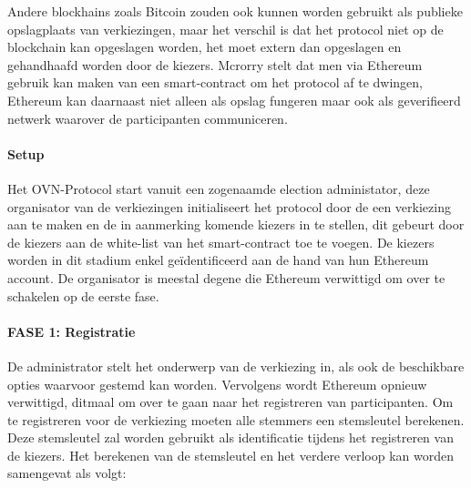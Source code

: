 			Andere blockhains zoals Bitcoin zouden ook kunnen worden gebruikt als publieke opslagplaats van verkiezingen, maar het verschil is dat het protocol niet op de blockchain kan opgeslagen worden, het moet extern dan opgeslagen en gehandhaafd worden door de kiezers. Mcrorry stelt dat men via Ethereum gebruik kan maken van een smart-contract om  het protocol af te dwingen, Ethereum kan daarnaast niet alleen als opslag fungeren maar ook als geverifieerd netwerk waarover de participanten communiceren.
			\paragraph*{Setup }
			Het OVN-Protocol start vanuit een zogenaamde election administator, deze organisator van de verkiezingen initialiseert het protocol door de een verkiezing aan te maken en de in aanmerking komende kiezers in te stellen, dit gebeurt door de kiezers aan de white-list van het smart-contract toe te voegen. De kiezers worden in dit stadium enkel geïdentificeerd aan de hand van hun Ethereum account. De organisator is meestal degene die  Ethereum verwittigd om over te schakelen op de eerste fase.
			\paragraph*{FASE 1: Registratie }
			De administrator stelt het onderwerp van de verkiezing in, als ook de beschikbare opties waarvoor gestemd kan worden. Vervolgens wordt Ethereum opnieuw verwittigd, ditmaal om over te gaan naar het registreren van participanten. Om te registreren voor de verkiezing moeten alle stemmers een stemsleutel berekenen. Deze stemsleutel zal worden gebruikt als identificatie tijdens het registreren van de kiezers. Het berekenen  van de stemsleutel en het verdere verloop kan worden samengevat als volgt: 
			
